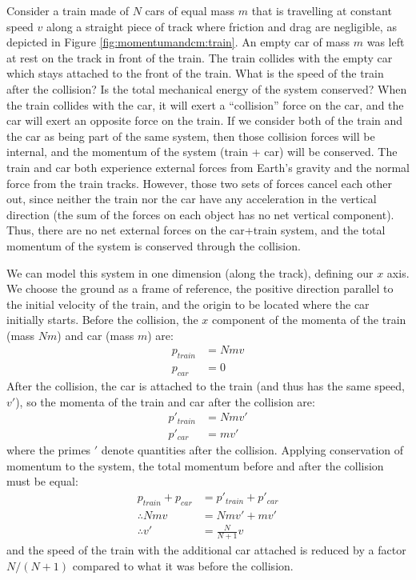 \begin{example}{ 
Consider a train made of $N$ cars of equal mass $m$ that is travelling at constant speed $v$ along a straight piece of track where friction and drag are negligible, as depicted in Figure \ref{fig:momentumandcm:train}. An empty car of mass $m$ was left at rest on the track in front of the train. The train collides with the empty car which stays attached to the front of the train. What is the speed of the train after the collision? Is the total mechanical energy of the system conserved?}
When the train collides with the car, it will exert a ``collision'' force on the car, and the car will exert an opposite force on the train. If we consider both of the train and the car as being part of the same system, then those collision forces will be internal, and the momentum of the system (train + car) will be conserved. The train and car both experience external forces from Earth's gravity and the normal force from the train tracks. However, those two sets of forces cancel each other out, since neither the train nor the car have any acceleration in the vertical direction (the sum of the forces on each object has no net vertical component). Thus, there are no net external forces on the car+train system, and the total momentum of the system is conserved through the collision.

We can model this system in one dimension (along the track), defining our $x$ axis. We choose the ground as a frame of reference, the positive direction parallel to the initial velocity of the train, and the origin to be located where the car initially starts. Before the collision, the $x$ component of the momenta of the train (mass $Nm$) and car (mass $m$) are:
\begin{align*}
p_{train}&=Nmv\\
p_{car}&=0
\end{align*}
After the collision, the car is attached to the train (and thus has the same speed, $v'$), so the momenta of the train and car after the collision are:
\begin{align*}
p'_{train}&=Nmv'\\
p'_{car}&=mv'
\end{align*}
where the primes $'$ denote quantities after the collision. Applying conservation of momentum to the system, the total momentum before and after the collision must be equal:
\begin{align*}
p_{train}+p_{car}&=p'_{train}+p'_{car}\\
\therefore Nmv &= Nmv' +mv'\\
\therefore v' &=\frac{N}{N+1}v
\end{align*}
and the speed of the train with the additional car attached is reduced by a factor $N/(N+1)$ compared to what it was before the collision.


\end{example}
